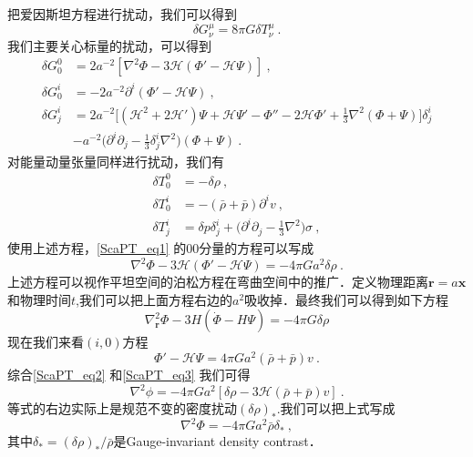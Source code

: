 
\begin{issues}
\issueNeedCite
\issueMissDepend
\end{issues}

把爱因斯坦方程进行扰动，我们可以得到
\begin{equation}\label{ScaPT_eq1}
\delta G^\mu_\nu = 8 \pi G\delta T^\mu_\nu ~.
\end{equation}
我们主要关心标量的扰动，可以得到
\begin{equation}
\begin{aligned}
\delta G^0_0 & = 2 a^{-2} [\nabla^2 \Phi- 3 \mathcal H(\Phi' - \mathcal H \Psi)] ~,  \\
\delta G^i_0 & = - 2 a^{-2} \partial^i(\Phi' - \mathcal H \Psi)~, \\
\delta G^i_j &= 2 a^{-2} \bigg[ (\mathcal H^2 + 2 \mathcal H')\Psi +\mathcal H \Psi' - \Phi'' - 2 \mathcal H \Phi' + \frac{1}{3} \nabla^2 (\Phi+\Psi)  \bigg] \delta^i_j \\
& - a^{-2} \bigg( \partial^i\partial_j - \frac{1}{3} \delta^i_j \nabla^2 \bigg) (\Phi+\Psi) ~.
\end{aligned}
\end{equation}
对能量动量张量同样进行扰动，我们有
\begin{equation}
\begin{aligned}
\delta T^0_0 & = - \delta \rho~, \\
\delta T^i_0 & = - (\bar \rho +\bar p) \partial^i v~, \\
\delta T^i_j & = \delta p \delta^i_j + \bigg( \partial^i\partial_j - \frac{1}{3} \nabla^2 \bigg) \sigma ~,
\end{aligned}
\end{equation}
使用上述方程，\autoref{ScaPT_eq1} 的00分量的方程可以写成
\begin{equation}\label{ScaPT_eq2}
\nabla^2 \Phi - 3 \mathcal H (\Phi' - \mathcal H\Psi) = - 4 \pi G a^2 \delta \rho~. 
\end{equation}
上述方程可以视作平坦空间的泊松方程在弯曲空间中的推广．定义物理距离$\mathbf r = a \mathbf x$和物理时间$t$,我们可以把上面方程右边的$a^2$吸收掉．最终我们可以得到如下方程
\begin{equation}
\nabla^2_{\mathbf r} \Phi - 3 H (\dot\Phi - H \Psi) = - 4 \pi G \delta \rho
\end{equation}
现在我们来看$(i,0)$方程
\begin{equation}\label{ScaPT_eq3}
\Phi' - \mathcal H \Psi = 4 \pi G a^2 (\bar \rho + \bar p) v ~.
\end{equation}
综合\autoref{ScaPT_eq2} 和\autoref{ScaPT_eq3} 我们可得
\begin{equation}
\nabla^2\phi = - 4 \pi G a^2 [\delta \rho - 3 \mathcal H(\bar\rho+ \bar p) v]~.
\end{equation}
等式的右边实际上是规范不变的密度扰动$(\delta\rho)_*$.我们可以把上式写成
\begin{equation}
\nabla^2\Phi = - 4 \pi G a^2 \bar \rho \delta_* ~,
\end{equation}
其中$\delta_* = (\delta \rho)_*/\bar \rho$是Gauge-invariant density contrast．

